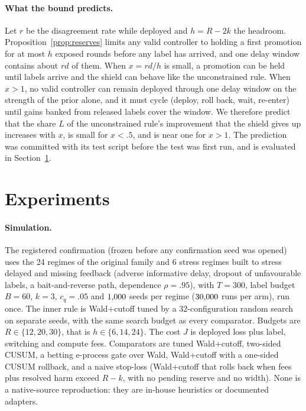 \documentclass{article}
\theoremstyle{plain}
\theoremstyle{definition}
\begin{document}
\paragraph{What the bound predicts.}
Let $r$ be the disagreement rate while deployed and $h=R-2k$ the headroom. Proposition~\ref{prop:reserves} limits any valid controller to holding a first promotion for at most $h$ exposed rounds before any label has arrived, and one delay window contains about $rd$ of them. When $x=rd/h$ is small, a promotion can be held until labels arrive and the shield can behave like the unconstrained rule. When $x>1$, no valid controller can remain deployed through one delay window on the strength of the prior alone, and it must cycle (deploy, roll back, wait, re-enter) until gains banked from released labels cover the window. We therefore predict that the share $L$ of the unconstrained rule's improvement that the shield gives up increases with $x$, is small for $x<.5$, and is near one for $x>1$. The prediction was committed with its test script before the test was first run, and is evaluated in Section~\ref{sec:exp}.

\section{Experiments}\label{sec:exp}
\paragraph{Simulation.}
The registered confirmation (frozen before any confirmation seed was opened) uses the 24 regimes of the original family and 6 stress regimes built to stress delayed and missing feedback (adverse informative delay, dropout of unfavourable labels, a bait-and-reverse path, dependence $\rho=.95$), with $T=300$, label budget $B=60$, $k=3$, $c_q=.05$ and $1{,}000$ seeds per regime ($30{,}000$ runs per arm), run once. The inner rule is Wald+cutoff tuned by a 32-configuration random search on separate seeds, with the same search budget as every comparator. Budgets are $R\in\{12,20,30\}$, that is $h\in\{6,14,24\}$. The cost $J$ is deployed loss plus label, switching and compute fees. Comparators are tuned Wald+cutoff, two-sided CUSUM, a betting e-process gate over Wald, Wald+cutoff with a one-sided CUSUM rollback, and a naive stop-loss (Wald+cutoff that rolls back when fees plus resolved harm exceed $R-k$, with no pending reserve and no width). None is a native-source reproduction: they are in-house heuristics or documented adapters.
\end{document}

